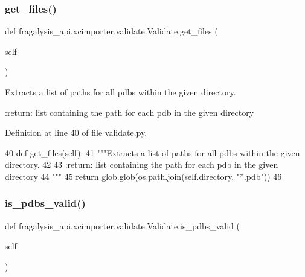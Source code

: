 \subsubsection{\texorpdfstring{get\+\_\+files()}{get\_files()}}
{\footnotesize\ttfamily def fragalysis\+\_\+api.\+xcimporter.\+validate.\+Validate.\+get\+\_\+files (\begin{DoxyParamCaption}\item[{}]{self }\end{DoxyParamCaption})}

\begin{DoxyVerb}Extracts a list of paths for all pdbs within the given directory.

:return: list containing the path for each pdb in the given directory
\end{DoxyVerb}
 

Definition at line 40 of file validate.\+py.


\begin{DoxyCode}
40     \textcolor{keyword}{def }get\_files(self):
41         \textcolor{stringliteral}{"""Extracts a list of paths for all pdbs within the given directory.}
42 \textcolor{stringliteral}{}
43 \textcolor{stringliteral}{        :return: list containing the path for each pdb in the given directory}
44 \textcolor{stringliteral}{        """}
45         \textcolor{keywordflow}{return} glob.glob(os.path.join(self.directory, \textcolor{stringliteral}{"*.pdb"}))
46 
\end{DoxyCode}
\mbox{\label{classfragalysis__api_1_1xcimporter_1_1validate_1_1_validate_a174b180dade39cdd984389ab32ed3732}} 
\subsubsection{\texorpdfstring{is\+\_\+pdbs\+\_\+valid()}{is\_pdbs\_valid()}}
{\footnotesize\ttfamily def fragalysis\+\_\+api.\+xcimporter.\+validate.\+Validate.\+is\+\_\+pdbs\+\_\+valid (\begin{DoxyParamCaption}\item[{}]{self }\end{DoxyParamCaption})}

